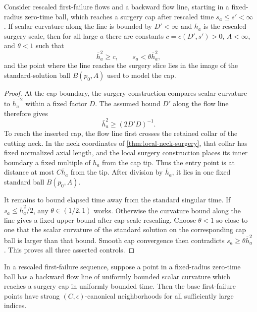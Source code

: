\begin{lemma}
\label{lem:standard-cap-encounter-control}
\notready
Consider rescaled first-failure flows and a backward flow line, starting in
a fixed-radius zero-time ball, which reaches a surgery cap after rescaled
time $s_a\le s'<\infty$.  If scalar curvature along the line is bounded by
$D'<\infty$ and $\bar h_a$ is the rescaled surgery scale, then for all large
$a$ there are constants $c=c(D',s')>0$, $A<\infty$, and $\theta<1$ such that
\[
 \bar h_a^2\ge c,
 \qquad s_a<\theta\bar h_a^2,
\]
and the point where the line reaches the surgery slice lies in the image of
the standard-solution ball $B(p_0,A)$ used to model the cap.
\end{lemma}

\begin{proof}
At the cap boundary, the surgery construction compares scalar curvature to
$\bar h_a^{-2}$ within a fixed factor $D$.  The assumed bound $D'$ along the
flow line therefore gives
\[
 \bar h_a^2\ge(2D'D)^{-1}.
\]
To reach the inserted cap, the flow line first crosses the retained collar
of the cutting neck.  In the neck coordinates of
\ref{thm:local-neck-surgery}, that collar has fixed normalized axial length,
and the local surgery construction places its inner boundary a fixed
multiple of $\bar h_a$ from the cap tip.  Thus the entry point is at distance
at most $C\bar h_a$ from the tip.  After division by $\bar h_a$, it lies in
one fixed standard ball $B(p_0,A)$.

It remains to bound elapsed time away from the standard singular time.  If
$s_a\le\bar h_a^2/2$, any $\theta\in(1/2,1)$ works.  Otherwise the curvature
bound along the line gives a fixed upper bound after cap-scale rescaling.
Choose $\theta<1$ so close to one that the scalar curvature of the standard
solution on the corresponding cap ball is larger than that bound.  Smooth
cap convergence then contradicts $s_a\ge\theta\bar h_a^2$.  This proves all
three asserted controls.
\end{proof}

\begin{lemma}
\label{lem:bounded-flow-line-cap-exclusion}
\notready
In a rescaled first-failure sequence, suppose a point in a fixed-radius
zero-time ball has a backward flow line of uniformly bounded scalar
curvature which reaches a surgery cap in uniformly bounded time.  Then the
base first-failure points have strong $(C,\epsilon)$-canonical neighborhoods
for all sufficiently large indices.
\end{lemma}

